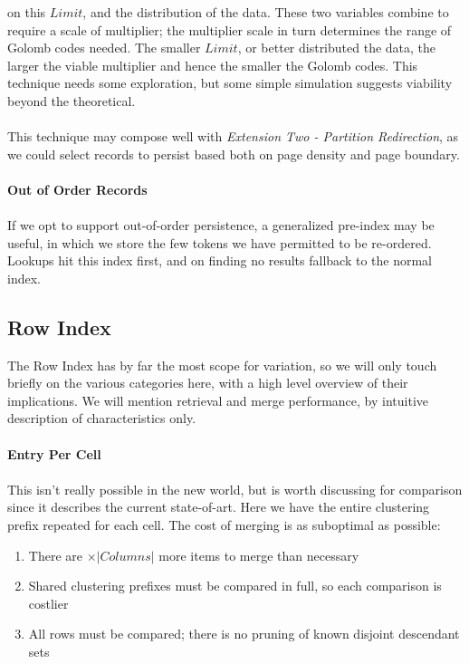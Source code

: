 \documentclass[fleqn]{article}
\begin{document}
\begin{enumerate}
        on this $Limit$, and the distribution of the data. These two variables combine to require a scale of 
        multiplier; the multiplier scale in turn determines the range of Golomb codes needed.
        The smaller $Limit$, or better distributed the data, the larger the viable multiplier and hence the 
        smaller the Golomb codes. This technique needs some exploration, but some simple simulation suggests
        viability beyond the theoretical.
        \\\\
        This technique may compose well with \textit{Extension Two - Partition Redirection}, as we could
        select records to persist based both on page density and page boundary.
    \end{enumerate}

\small
\paragraph{Out of Order Records}
\paragraph{}
    If we opt to support out-of-order persistence, a generalized pre-index may be useful, in which we store 
    the few tokens we have permitted to be re-ordered. Lookups hit this index first, and on finding no results
    fallback to the normal index.

\subsection{Row Index}
The Row Index has by far the most scope for variation, so we will only touch briefly on the various
categories here, with a high level overview of their implications. We will mention retrieval and
merge performance, by intuitive description of characteristics only.
\paragraph{Entry Per Cell}
\paragraph{}
    This isn't really possible in the new world, but is worth discussing for comparison since it
    describes the current state-of-art. Here we have the entire clustering prefix repeated for each cell.
    The cost of merging is as suboptimal as possible: 
    \begin{enumerate}
      \item There are $\times \lvert Columns \rvert$ more items to merge than necessary
      \item Shared clustering prefixes must be compared in full, so each comparison is costlier
      \item All rows must be compared; there is no pruning of known disjoint descendant sets 
    \end{enumerate}
\end{document}
